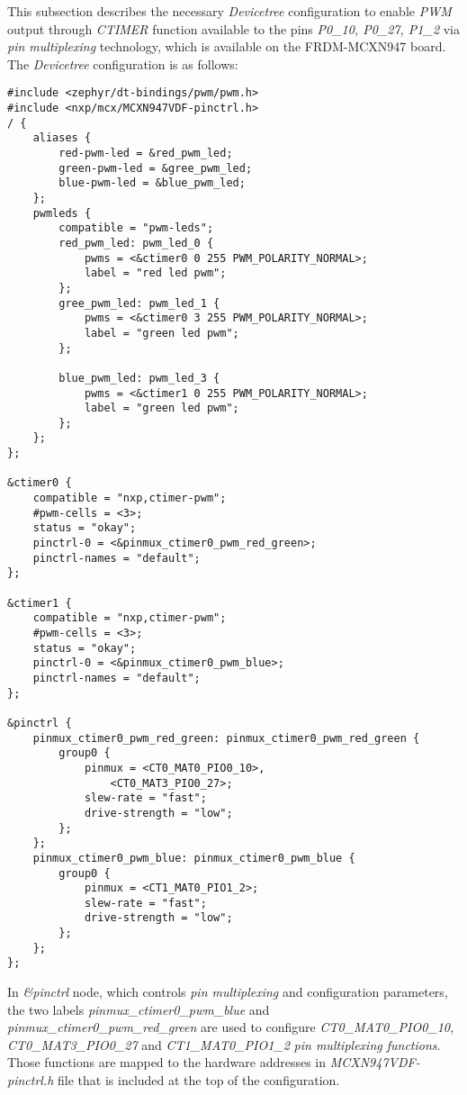 \documentclass[twoside, 12pt]{article}
\begin{document}
This subsection describes the necessary \textit{Devicetree} configuration to enable 
\textit{PWM} output through \textit{CTIMER} function available to the pins \textit{P0\_10, P0\_27, P1\_2} via \textit{pin multiplexing} technology\cite{mcx_manual}, which is available 
on the FRDM-MCXN947 board. The \textit{Devicetree} configuration is as follows:
\begin{lstlisting}[caption={Configuring PWM support through CTIMER functionality on FRDM-MCXN947 pins P0\_10, P0\_27 and P1\_2 with Devicetree},breaklines=true]
#include <zephyr/dt-bindings/pwm/pwm.h>
#include <nxp/mcx/MCXN947VDF-pinctrl.h>
/ {
    aliases {
        red-pwm-led = &red_pwm_led;
        green-pwm-led = &gree_pwm_led;
        blue-pwm-led = &blue_pwm_led;
    };
    pwmleds {
        compatible = "pwm-leds";
        red_pwm_led: pwm_led_0 {
            pwms = <&ctimer0 0 255 PWM_POLARITY_NORMAL>;
            label = "red led pwm";
        };
        gree_pwm_led: pwm_led_1 {
            pwms = <&ctimer0 3 255 PWM_POLARITY_NORMAL>;
            label = "green led pwm";
        };

        blue_pwm_led: pwm_led_3 {
            pwms = <&ctimer1 0 255 PWM_POLARITY_NORMAL>;
            label = "green led pwm";
        };
    };
};

&ctimer0 {
    compatible = "nxp,ctimer-pwm";
    #pwm-cells = <3>;
    status = "okay";
    pinctrl-0 = <&pinmux_ctimer0_pwm_red_green>;
	pinctrl-names = "default";
};

&ctimer1 {
    compatible = "nxp,ctimer-pwm";
    #pwm-cells = <3>;
    status = "okay";
    pinctrl-0 = <&pinmux_ctimer0_pwm_blue>;
	pinctrl-names = "default";
};

&pinctrl {
    pinmux_ctimer0_pwm_red_green: pinmux_ctimer0_pwm_red_green {
        group0 {
            pinmux = <CT0_MAT0_PIO0_10>,
                <CT0_MAT3_PIO0_27>;
            slew-rate = "fast";
            drive-strength = "low";
        };
    };
    pinmux_ctimer0_pwm_blue: pinmux_ctimer0_pwm_blue {
        group0 {
            pinmux = <CT1_MAT0_PIO1_2>;
            slew-rate = "fast";
            drive-strength = "low";
        };
    };
};
\end{lstlisting}

In \textit{\&pinctrl} node, which controls \textit{pin multiplexing} and configuration 
parameters\cite{zephyr_start}, the two labels \textit{pinmux\_ctimer0\_pwm\_blue} and 
\textit{pinmux\_ctimer0\_pwm\_red\_green} are used to configure \textit{CT0\_MAT0\_PIO0\_10, 
CT0\_MAT3\_PIO0\_27} and \textit{CT1\_MAT0\_PIO1\_2} \textit{pin multiplexing functions}. 
Those functions are mapped to the hardware addresses in \textit{MCXN947VDF-pinctrl.h} file 
that is included at the top of the configuration.
\end{document}

